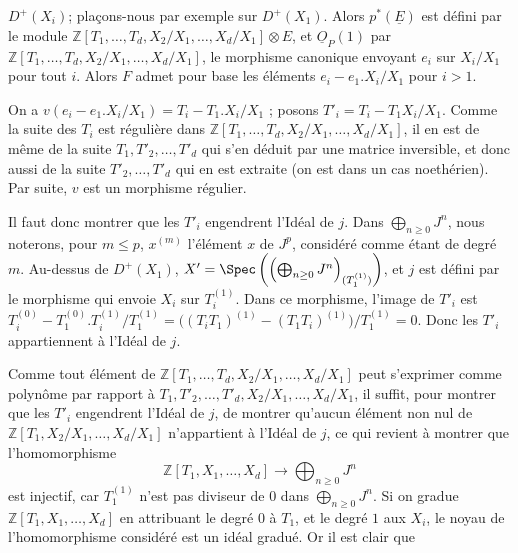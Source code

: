 
\(D^+(X_i)\); plaçons-nous par exemple sur \(D^+(X_1)\). Alors \(p^*(\underline{E})\) est défini par le module \(\mathbb Z[T_1,\ldots,T_d,X_2/X_1,\ldots,X_d/X_1]\otimes E\), et \(\underline{O}_P(1)\) par \(\mathbb Z[T_1,\ldots,T_d,X_2/X_1,\ldots,X_d/X_1]\), le morphisme canonique envoyant \(e_i\) sur \(X_i/X_1\) pour tout \(i\). Alors \(F\) admet pour base les éléments \(e_i-e_1.X_i/X_1\) pour \(i>1\).

On a \(v(e_i-e_1.X_i/X_1)=T_i-T_1.X_i/X_1\) ; posons \(T'_i=T_i-T_1X_i/X_1\).
Comme la suite des \(T_i\) est régulière dans \(\mathbb Z[T_1,\ldots,T_d,X_2/X_1,\ldots,X_d/X_1]\), il en est de même de la suite \(T_1,T'_2,\ldots,T'_d\) qui s'en déduit par une matrice inversible, et donc aussi de la suite \(T'_2,\ldots,T'_d\) qui en est extraite (on est dans un cas noethérien). Par suite, \(v\) est un morphisme régulier.

Il faut donc montrer que les \(T'_i\) engendrent l'Idéal de \(j\). Dans \(\bigoplus_{n\ge0}J^n\), nous noterons, pour \(m\le p\), \(x^{(m)}\) l'élément \(x\) de \(J^p\), considéré comme étant de degré \(m\). Au-dessus de \(D^+(X_1)\), \(X'=\Spec\left(\left(\bigoplus_{n\ge0}J^n\right)_{(T_1^{(1)})}\right)\), et \(j\) est défini par le morphisme qui envoie \(X_i\) sur \(T_i^{(1)}\). Dans ce morphisme, l'image de \(T'_i\) est \(T_i^{(0)}-T_1^{(0)}.T_i^{(1)}/T_1^{(1)}=\bigl((T_iT_1)^{(1)}-(T_1T_i)^{(1)}\bigr)/T_1^{(1)}=0\). Donc les \(T'_i\) appartiennent à l'Idéal de \(j\).

Comme tout élément de \(\mathbb Z[T_1,\ldots,T_d,X_2/X_1,\ldots,X_d/X_1]\) peut s'exprimer comme polynôme par rapport à \(T_1,T'_2,\ldots,T'_d,X_2/X_1,\ldots,X_d/X_1\), il suffit, pour montrer que les \(T'_i\) engendrent l'Idéal de \(j\), de montrer qu'aucun élément non nul de \(\mathbb Z[T_1,X_2/X_1,\ldots,X_d/X_1]\) n'appartient à l'Idéal de \(j\), ce qui revient à montrer que l'homomorphisme
\[
\mathbb Z[T_1,X_1,\ldots,X_d]\longrightarrow\bigoplus_{n\ge0}J^n
\]
est injectif, car \(T_1^{(1)}\) n'est pas diviseur de 0 dans \(\bigoplus_{n\ge0}J^n\). Si on gradue \(\mathbb Z[T_1,X_1,\ldots,X_d]\) en attribuant le degré \(0\) à \(T_1\), et le degré \(1\) aux \(X_i\), le noyau de l'homomorphisme considéré est un idéal gradué. Or il est clair que

